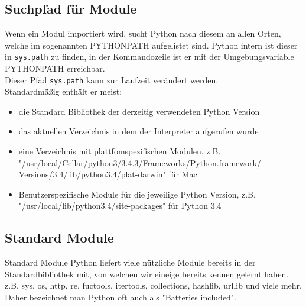 \begin{frame}
	
	
\end{frame}

\subsection{Suchpfad für Module}
\begin{frame}
	Wenn ein Modul importiert wird, sucht Python nach diesem an allen Orten, welche im sogenannten PYTHONPATH aufgelistet sind. Python intern ist dieser in \texttt{sys.path} zu finden, in der Kommandozeile ist er mit der Umgebungsvariable PYTHONPATH erreichbar.\\
	Dieser Pfad \texttt{sys.path} kann zur Laufzeit verändert werden.\\
	Standardmä\ss{}ig enthält er meist:
	\begin{itemize}
		\item die Standard Bibliothek der derzeitig verwendeten Python Version
		\item das aktuellen Verzeichnis in dem der Interpreter aufgerufen wurde
		\item eine Verzeichnis mit plattfomspezifischen Modulen, z.B.
			"/usr/local/Cellar/python3/3.4.3/Frameworks/Python.framework/
			Versions/3.4/lib/python3.4/plat-darwin" für Mac
		\item Benutzerspezifische Module für die jeweilige Python Version, z.B. "/usr/local/lib/python3.4/site-packages" für Python 3.4
	\end{itemize}
\end{frame}

\subsection{Standard Module}
\begin{frame}{Standard Module}
	Python liefert viele nützliche Module bereits in der Standardbibliothek mit, von welchen wir eineige bereits kennen gelernt haben.
	z.B. sys, os, http, re, fuctools, itertools, collections, hashlib, urllib und viele mehr. Daher bezeichnet man Python oft auch als "Batteries included".
\end{frame}

